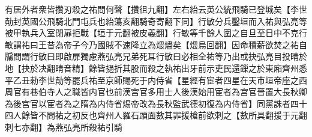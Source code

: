 有居外者衆皆攢刃殺之祐問何聲【攢徂九翻】左右紿云英公統飛騎已登城矣【李世勣封英國公飛騎北門屯兵也紿蕩亥翻騎奇寄翻下同】行敏分兵鑿垣而入祐與弘亮等被甲執兵入室閉扉拒戰【垣于元翻被皮義翻】行敏等千餘人圍之自旦至日中不克行敏謂祐曰王昔為帝子今乃國賊不速降立為煨燼矣【煨烏回翻】因命積薪欲焚之祐自牖間謂行敏曰即啟扉獨慮燕弘亮兄弟死耳行敏曰必相全祐等乃出或抉弘亮目投睛於地【抉於决翻睛音精】餘皆撾折其股而殺之執祐出牙前示吏民還鏁之於東廂齊州悉平乙丑勑李世勣等罷兵祐至京師賜死于内侍省【星經有宦者四星在天市垣帝座之西周官有巷伯寺人之職皆内官也前漢宫官多用士人後漢始用宦者為宫官晉置大長秋卿為後宫官以宦者為之隋為内侍省焬帝改為長秋監武德初復為内侍省】同黨誅者四十四人餘皆不問祐之初反也齊州人羅石頭面數其罪援槍前欲刺之【數所具翻援于元翻刺七亦翻】為燕弘亮所殺祐引騎